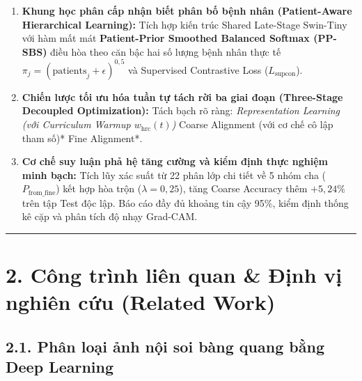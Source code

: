 \documentclass[
  10pt,
  a4paper,
  twocolumn]{article}
\providecommand{\tightlist}{%
  \setlength{\itemsep}{0pt}\setlength{\parskip}{0pt}}
\begin{document}
\begin{enumerate}
\def\labelenumi{\arabic{enumi}.}
\tightlist
\item
  \textbf{Khung học phân cấp nhận biết phân bố bệnh nhân (Patient-Aware
  Hierarchical Learning):} Tích hợp kiến trúc Shared Late-Stage
  Swin-Tiny với hàm mất mát \textbf{Patient-Prior Smoothed Balanced
  Softmax (PP-SBS)} điều hòa theo căn bậc hai số lượng bệnh nhân thực tế
  \(\pi_j = (\text{patients}_j + \epsilon)^{0{,}5}\) và Supervised
  Contrastive Loss (\(L_{\text{supcon}}\)).
\item
  \textbf{Chiến lược tối ưu hóa tuần tự tách rời ba giai đoạn
  (Three-Stage Decoupled Optimization):} Tách bạch rõ ràng:
  \emph{Representation Learning (với Curriculum Warmup
  \(w_{\text{hrc}}(t)\))} \rightarrow *Coarse Alignment (với cơ chế cô
  lập tham số)* \rightarrow *Fine Alignment*.
\item
  \textbf{Cơ chế suy luận phả hệ tăng cường và kiểm định thực nghiệm
  minh bạch:} Tích lũy xác suất từ 22 phân lớp chi tiết về 5 nhóm cha
  (\(P_{\text{from\_fine}}\)) kết hợp hòa trộn (\(\lambda=0{,}25\)),
  tăng Coarse Accuracy thêm \(+5{,}24\%\) trên tập Test độc lập. Báo cáo
  đầy đủ khoảng tin cậy 95\%, kiểm định thống kê cặp và phân tích độ
  nhạy Grad-CAM.
\end{enumerate}

\begin{center}\rule{0.5\linewidth}{0.5pt}\end{center}

\section{2. Công trình liên quan \& Định vị nghiên cứu (Related
Work)}\label{cuxf4ng-truxecnh-liuxean-quan-ux111ux1ecbnh-vux1ecb-nghiuxean-cux1ee9u-related-work}

\subsection{2.1. Phân loại ảnh nội soi bàng quang bằng Deep
Learning}\label{phuxe2n-loux1ea1i-ux1ea3nh-nux1ed9i-soi-buxe0ng-quang-bux1eb1ng-deep-learning}
\end{document}
